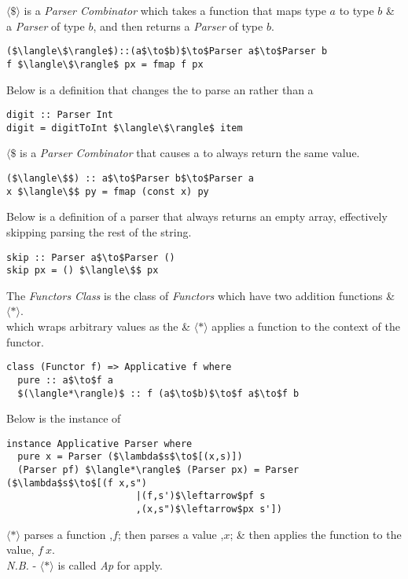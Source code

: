 \documentclass[11pt,a4paper]{article}
\begin{document}
$\langle\$\rangle$ is a \textit{Parser Combinator} which takes a function that maps type $a$ to type $b$ \& a \textit{Parser} of type $b$, and then returns a \textit{Parser} of type $b$.
\begin{lstlisting}
($\langle\$\rangle$)::(a$\to$b)$\to$Parser a$\to$Parser b
f $\langle\$\rangle$ px = fmap f px
\end{lstlisting}

Below is a definition that changes the {} to parse an {} rather than a {}
\begin{lstlisting}
digit :: Parser Int
digit = digitToInt $\langle\$\rangle$ item
\end{lstlisting}

$\langle\$$ is a \textit{Parser Combinator} that causes a {} to always return the same value.
\begin{lstlisting}
($\langle\$$) :: a$\to$Parser b$\to$Parser a
x $\langle\$$ py = fmap (const x) py
\end{lstlisting}

Below is a definition of a parser that always returns an empty array, effectively skipping parsing the rest of the string.
\begin{lstlisting}
skip :: Parser a$\to$Parser ()
skip px = () $\langle\$$ px
\end{lstlisting}

The {} \textit{Functors Class} is the class of \textit{Functors} which have two addition functions {} \& $\langle*\rangle$.\\
{} which wraps arbitrary values as the {} \& $\langle*\rangle$ applies a function to the context of the functor.
\begin{lstlisting}
class (Functor f) => Applicative f where
  pure :: a$\to$f a
  $(\langle*\rangle)$ :: f (a$\to$b)$\to$f a$\to$f b
\end{lstlisting}

Below is the {} instance of {}
\begin{lstlisting}
instance Applicative Parser where
  pure x = Parser ($\lambda$s$\to$[(x,s)])
  (Parser pf) $\langle*\rangle$ (Parser px) = Parser ($\lambda$s$\to$[(f x,s")
  					   |(f,s')$\leftarrow$pf s
  					   ,(x,s")$\leftarrow$px s'])
\end{lstlisting}
$\langle*\rangle$ parses a function ,$f$; then parses a value ,$x$; \& then applies the function to the value, $f\ x$.\\
\textit{N.B.} - $\langle*\rangle$ is called \textit{Ap} for apply.\\
\end{document}
